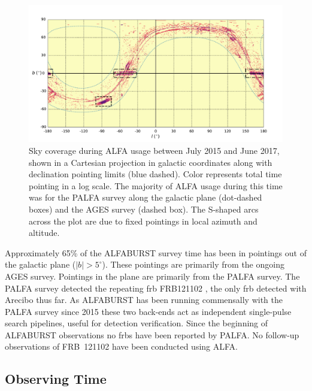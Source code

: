 \documentclass[a4paper,fleqn,usenatbib]{mnras}
\begin{document}
\begin{figure}
    \includegraphics[width=1.0\linewidth]{figures/cartview_sky_coverage.pdf}
    \caption{Sky coverage during ALFA usage between July 2015 and June 2017,
    shown in a Cartesian projection in galactic coordinates along with
    declination pointing limits (blue dashed). Color represents total time
    pointing in a log scale. The majority of ALFA usage during this time was for
    the PALFA survey along the galactic plane (dot-dashed boxes) and the AGES
    survey (dashed box).  The S-shaped arcs across the plot are due to fixed
    pointings in local azimuth and altitude.
    }
    \label{fig:sky_coverage}
\end{figure}

Approximately 65\% of the ALFABURST survey time has been in pointings out of the
galactic plane ($|b| > 5^{\circ}$).  These pointings are primarily from the
ongoing AGES survey.  Pointings in the plane are primarily from the PALFA
survey.  The PALFA survey detected the repeating \gls{frb} FRB121102
\citep{2014ApJ...790..101S}, the only \gls{frb} detected with Arecibo thus far.
As ALFABURST has been running commensally with the PALFA survey since 2015 these
two back-ends act as independent single-pulse search pipelines, useful for
detection verification.  Since the beginning of ALFABURST observations no
\glspl{frb} have been reported by PALFA. No follow-up observations of FRB~121102
have been conducted using ALFA.



\subsection{Observing Time}
\label{sec:obs_time}
\end{document}
